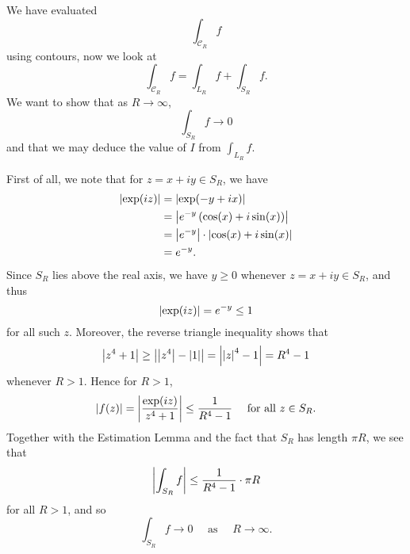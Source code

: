 We have evaluated
\[
\int_{\mathcal{C}_R} f
\]
using contours, now we look at
\[
\int_{\mathcal{C}_R} f = \int_{L_R} f + \int_{S_R} f.
\]
We want to show that as $R \to \infty$,
\[
\int_{S_R} f \to 0 
\]
and that we may deduce the value of $I$ from $\displaystyle \int_{L_R} f$.


First of all, we note that for $z=x+iy \in S_R$, we have 
\begin{align*}
\left| \exp(iz) \right| & = \left|  \exp (-y+ix)  \right| \\
& = \left| e^{-y} \left( \cos (x) + i \sin (x) \right)  \right| \\
& = \left|  e^{-y}  \right| \cdot \left|  \cos(x) + i \sin (x)  \right| \\
& = e^{-y}.
\end{align*}
Since $S_R$ lies above the real axis, we have $y \geq 0$ whenever $z=x+iy \in S_R$, and thus
\[
\left| \exp(iz)  \right| = e^{-y} \leq 1
\]
for all such $z$.  Moreover, the reverse triangle inequality shows that
\[
\left| z^4+1 \right| \geq \left|  \left| z^4 \right| - \left| 1 \right|  \right| = \left|  \left| z \right|^4-1 \right| = R^4-1
\]
whenever $R>1$.  Hence for $R>1$,
\[
\left|  f(z)  \right| = \left|  \frac{\exp(iz)}{z^4+1}  \right| \leq \frac{1}{R^4-1} \quad \text{ for all } z \in S_R.
\]
Together with the Estimation Lemma and the fact that $S_R$ has length $\pi R$, we see that
\[
\left|  \int_{S_R} f  \right| \leq \frac{1}{R^4-1} \cdot \pi R
\]
for all $R>1$, and so
\[
\int_{S_R} f \to 0 \quad\text{ as }\quad R \to \infty.
\]

